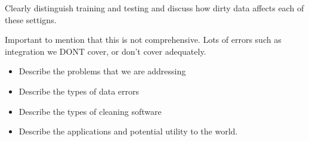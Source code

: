 Clearly distinguish training and testing and discuss how dirty data affects each of these settigns.

Important to mention that this is not comprehensive.  Lots of errors such as integration we DONT cover, or don't cover adequately.

\begin{itemize}
    \item Describe the problems that we are addressing
    \item Describe the types of data errors
    \item Describe the types of cleaning software
    \item Describe the applications and potential utility to the world.
\end{itemize}

